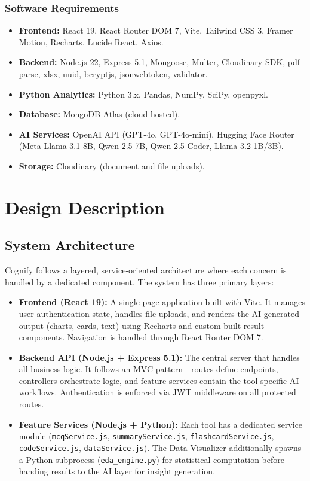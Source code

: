\documentclass[12pt,a4paper]{article}
\begin{document}
\subsubsection{Software Requirements}
\begin{itemize}
  \item \textbf{Frontend:} React 19, React Router DOM 7, Vite, Tailwind CSS 3, Framer Motion, Recharts, Lucide React, Axios.
  \item \textbf{Backend:} Node.js 22, Express 5.1, Mongoose, Multer, Cloudinary SDK, pdf-parse, xlsx, uuid, bcryptjs, jsonwebtoken, validator.
  \item \textbf{Python Analytics:} Python 3.x, Pandas, NumPy, SciPy, openpyxl.
  \item \textbf{Database:} MongoDB Atlas (cloud-hosted).
  \item \textbf{AI Services:} OpenAI API (GPT-4o, GPT-4o-mini), Hugging Face Router (Meta Llama 3.1 8B, Qwen 2.5 7B, Qwen 2.5 Coder, Llama 3.2 1B/3B).
  \item \textbf{Storage:} Cloudinary (document and file uploads).
\end{itemize}

\clearpage

\section{Design Description}

\subsection{System Architecture}

Cognify follows a layered, service-oriented architecture where each concern is handled by a dedicated component. The system has three primary layers:

\begin{itemize}
    \item \textbf{Frontend (React 19):} A single-page application built with Vite. It manages user authentication state, handles file uploads, and renders the AI-generated output (charts, cards, text) using Recharts and custom-built result components. Navigation is handled through React Router DOM 7.

    \item \textbf{Backend API (Node.js + Express 5.1):} The central server that handles all business logic. It follows an MVC pattern—routes define endpoints, controllers orchestrate logic, and feature services contain the tool-specific AI workflows. Authentication is enforced via JWT middleware on all protected routes.

    \item \textbf{Feature Services (Node.js + Python):} Each tool has a dedicated service module (\texttt{mcqService.js}, \texttt{summaryService.js}, \texttt{flashcardService.js}, \texttt{codeService.js}, \texttt{dataService.js}). The Data Visualizer additionally spawns a Python subprocess (\texttt{eda\_engine.py}) for statistical computation before handing results to the AI layer for insight generation.
\end{itemize}
\end{document}
